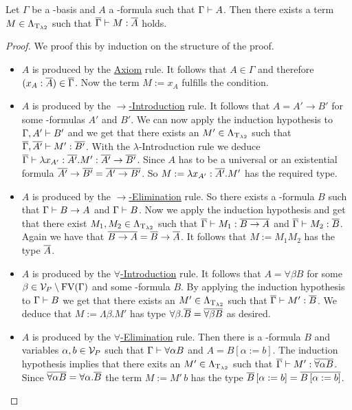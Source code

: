 \begin{lemma}\label{lem.4.2}
Let $\Gamma$ be a \SysP-basis and $A$ a \SysP-formula such that $\Gamma\vdash A$. Then there exists a term $M\in\Lambda_{\text{T}_{\lambda2}}$ such that $\overline{\Gamma}\vdash M:\overline{A}$ holds.
\end{lemma}
\begin{proof}
We proof this by induction on the structure of the proof. %

\begin{itemize}
	\item[] $A$ is produced by the \underline{Axiom} rule. It follows that $A\in\Gamma$ and therefore $(x_A:\overline{A})\in\overline{\Gamma}$. Now the term $M:=x_A$ fulfills the condition.
	
	\item[] $A$ is produced by the \underline{$\rightarrow$-Introduction} rule. It follows that $A=A'\to B'$ for some \SysP-formulas $A'$ and $B'$. We can now apply the induction hypothesis to $\Gamma,A'\vdash B'$ and we get that there exists an $M'\in\Lambda_{\text{T}_{\lambda2}}$ such that $\overline{\Gamma},\overline{A'}\vdash M':\overline{B'}$. With the $\lambda$-Introduction rule we deduce $\overline{\Gamma}\vdash \lambda x_{A'}:\overline{A'}.M':\overline{A'}\to\overline{B'}$. Since $A$ has to be a universal or an existential formula $\overline{A'}\to\overline{B'}=\overline{A'\to B'}$. So $M:=\lambda x_{A'}:\overline{A'}.M'$ has the required type.
	
	\item[] $A$ is produced by the \underline{$\rightarrow$-Elimination} rule. So there exists a \SysP-formula $B$ such that $\Gamma\vdash B\to A$ and $\Gamma\vdash B$. Now we apply the induction hypothesis and get that there exist $M_1,M_2\in\Lambda_{\text{T}_{\lambda2}}$ such that $\overline{\Gamma}\vdash M_1:\overline{B\to A}$ and $\overline{\Gamma}\vdash M_2:\overline{B}$. Again we have that $\overline{B\to A}=\overline{B}\to\overline{A}$. It follows that $M:=M_1M_2$ has the type $\overline{A}$.
	
	\item[] $A$ is produced by the \underline{$\forall$-Introduction} rule. It follows that $A=\forall\beta B$ for some $\beta\in\mathcal{V}_P\setminus\text{FV}(\Gamma)$ and some \SysP-formula $B$. By applying the induction hypothesis to $\Gamma\vdash B$ we get that there exists an $M'\in\Lambda_{\text{T}_{\lambda2}}$ such that $\overline{\Gamma}\vdash M':\overline{B}$. We deduce that $M:=\Lambda\beta.M'$ has type $\forall\beta.\overline{B}=\overline{\forall\beta B}$ as desired. 
	
	\item[] $A$ is produced by the \underline{$\forall$-Elimination} rule. Then there is a \SysP-formula $B$ and variables $\alpha,b\in\mathcal{V}_P$ such that $\Gamma\vdash\forall\alpha B$ and $A=B\left[\alpha:=b\right]$. The induction hypothesis implies that there exits an $M'\in\Lambda_{\text{T}_{\lambda2}}$ such that $\overline{\Gamma}\vdash M':\overline{\forall\alpha B}$. Since $\overline{\forall\alpha B}=\forall\alpha.\overline{B}$ the term $M:=M'\,b$ has the type $\overline{B}\left[\alpha:=b\right]=\overline{B\left[\alpha:=b\right]}$.
\end{itemize}
\end{proof}

